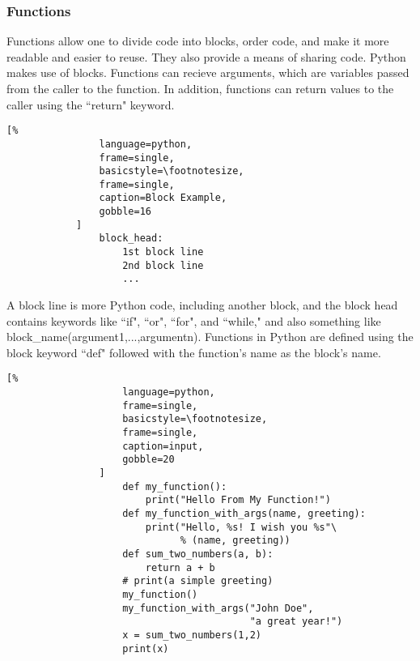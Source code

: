 \documentclass[crop=false,class=article,oneside]{standalone}
\begin{document}
        \subsubsection{Functions}
            Functions allow one to divide code into blocks, order
            code, and make it more readable and easier to reuse. They
            also provide a means of sharing code. Python makes use of
            blocks. Functions can recieve arguments, which are
            variables passed from the caller to the function. In
            addition, functions can return values to the caller using
            the ``return" keyword.
            \begin{lstlisting}[%
                language=python,
                frame=single,
                basicstyle=\footnotesize,
                frame=single,
                caption=Block Example,
                gobble=16
            ]
                block_head:
                    1st block line
                    2nd block line
                    ...
            \end{lstlisting}
            A block line is more Python code, including another
            block, and the block head contains keywords like ``if",
            ``or", ``for", and ``while," and also something like
            block\_name(argument1,...,argumentn). Functions in Python
            are defined using the block keyword ``def" followed with
            the function's name as the block's name.\newline
            \begin{minipage}[t]{.48\textwidth}
                \centering
                \begin{lstlisting}[%
                    language=python,
                    frame=single,
                    basicstyle=\footnotesize,
                    frame=single,
                    caption=input,
                    gobble=20
                ]
                    def my_function():
                        print("Hello From My Function!")
                    def my_function_with_args(name, greeting):
                        print("Hello, %s! I wish you %s"\
                              % (name, greeting))
                    def sum_two_numbers(a, b):
                        return a + b
                    # print(a simple greeting)
                    my_function()
                    my_function_with_args("John Doe",
                                          "a great year!")
                    x = sum_two_numbers(1,2)
                    print(x)
                \end{lstlisting}
            \end{minipage}\hfill
\end{document}
